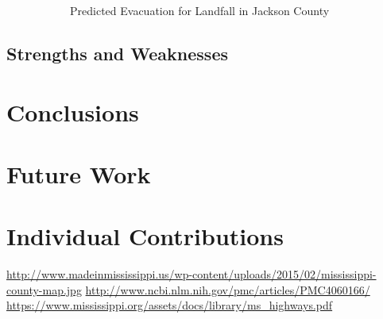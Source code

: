 \documentclass[titlepage]{article}
\begin{document}
\begin{figure}
\begin{subfigure}[b]{0.5\textwidth}
      \caption{Predicted Evacuation for Landfall in Jackson County}
    \end{subfigure}
    \caption{}
  \end{figure}
  \subsection{Strengths and Weaknesses}

\section{Conclusions}
\label{sec:conclusions}

\section{Future Work}
\label{sec:future}

\section{Individual Contributions}
\label{sec:contributions}
  \begin{thebibliography}{9}
      \url{http://www.madeinmississippi.us/wp-content/uploads/2015/02/mississippi-county-map.jpg}
      \url{http://www.ncbi.nlm.nih.gov/pmc/articles/PMC4060166/}
      \url{https://www.mississippi.org/assets/docs/library/ms_highways.pdf}
  \end{thebibliography}
\end{document}
